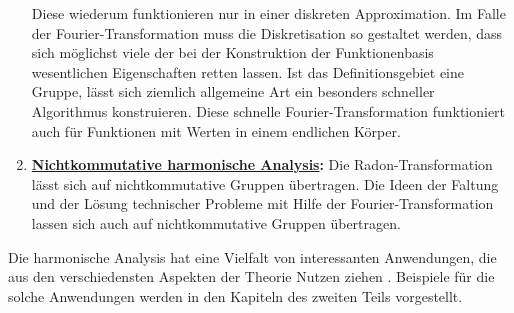 \begin{enumerate}
Diese wiederum funktionieren nur in einer diskreten Approximation.
Im Falle der Fourier-Transformation muss die Diskretisation so gestaltet
werden, dass sich möglichst viele der bei der Konstruktion der Funktionenbasis
wesentlichen Eigenschaften retten lassen.
Ist das Definitionsgebiet eine Gruppe, lässt sich ziemlich allgemeine
Art ein besonders schneller Algorithmus konstruieren.
Diese schnelle Fourier-Transformation funktioniert auch für Funktionen
mit Werten in einem endlichen Körper.
\item {\bf \hyperref[buch:chapter:nichtkomm]{Nichtkommutative harmonische Analysis}:}
Die Radon-Transformation lässt sich auf nichtkommutative Gruppen
übertragen.
Die Ideen der Faltung und der Lösung technischer Probleme mit Hilfe
der Fourier-Transformation lassen sich auch auf nichtkommutative
Gruppen übertragen.
\end{enumerate}

Die harmonische Analysis hat eine Vielfalt von interessanten
Anwendungen, die aus den verschiedensten Aspekten der Theorie
Nutzen ziehen .
Beispiele für die solche Anwendungen werden in den Kapiteln
des zweiten Teils vorgestellt.

